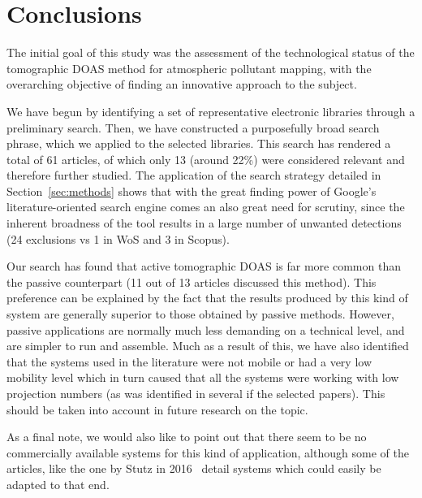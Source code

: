 \section{Conclusions}
\label{sec:conclusions}

The initial goal of this study was the assessment of the technological
status of the tomographic DOAS method for atmospheric pollutant mapping,
with the overarching objective of finding an innovative approach to the
subject.  

We have begun by identifying a set of representative electronic
libraries through a preliminary search. Then, we have constructed a
purposefully broad search phrase, which we applied to the selected
libraries. This search has rendered a total of 61 articles, of which
only 13 (around 22\%) were considered relevant and therefore further
studied. The application of the search strategy detailed in
Section~\ref{sec:methods} shows that with the great finding power of
Google's literature-oriented search engine comes an also great need for
scrutiny, since the inherent broadness of the tool results in a large
number of unwanted detections (24 exclusions vs 1 in WoS and 3 in
Scopus).

Our search has found that active tomographic DOAS is far more common
than the passive counterpart (11 out of 13 articles discussed this
method). This preference can be explained by the fact that the results
produced by this kind of system are generally superior to those obtained
by passive methods. However, passive applications are normally much less
demanding on a technical level, and are simpler to run and assemble.
Much as a result of this, we have also identified that the systems used
in the literature were not mobile or had a very low mobility level which
in turn caused that all the systems were working with low projection
numbers (as was identified in several if the selected papers). This
should be taken into account in future research on the topic.

As a final note, we would also like to point out that there seem to be
no commercially available systems for this kind of application, although
some of the articles, like the one by Stutz in 2016~\cite{Stutz2016}
detail systems which could easily be adapted to that end.


